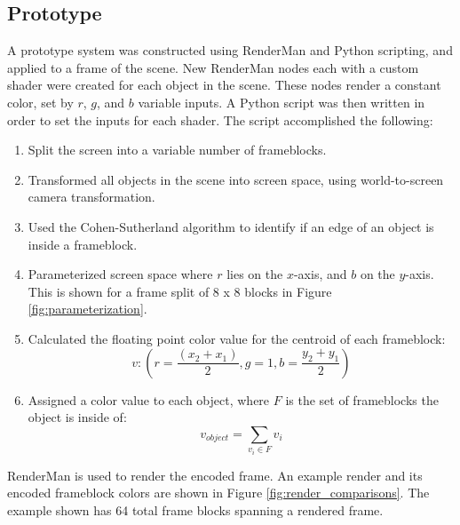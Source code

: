 \documentclass[conference]{IEEEtran}
\begin{document}
\subsection{Prototype}
A prototype system was constructed using RenderMan
and Python scripting, and applied to a frame of the scene.
New RenderMan nodes each with a custom shader were created for each object in the scene.
These nodes render a constant color, set by $r$, $g$, and $b$ variable inputs.
A Python script was then written in order to set the inputs for each shader.
The script accomplished the following:
\bigskip
\begin{enumerate}
\item Split the screen into a variable number of frameblocks.
\item Transformed all objects in the scene into screen space, using world-to-screen camera transformation.
\item Used the Cohen-Sutherland algorithm to identify if an edge of an object is inside a frameblock.
\item Parameterized screen space where $r$ lies on the $x$-axis, and $b$ on the $y$-axis.
This is shown for a frame split of 8 x 8 blocks in Figure \ref{fig:parameterization}.
\item Calculated the floating point color value for the centroid of each frameblock:
$$v : (r=\frac{(x_2 + x_1)}{2}, g=1, b=\frac{y_2 + y_1}{2})$$
\item Assigned a color value to each object, where
$F$ is the set of frameblocks the object is inside of:
$$v_{object} = \sum_{v_i\in F}v_i$$
\end{enumerate}
\bigskip
RenderMan is used to render the encoded frame.
An example render and its encoded frameblock colors are shown in Figure \ref{fig:render_comparisons}.
The example shown has 64 total frame blocks spanning a rendered frame.
\end{document}
